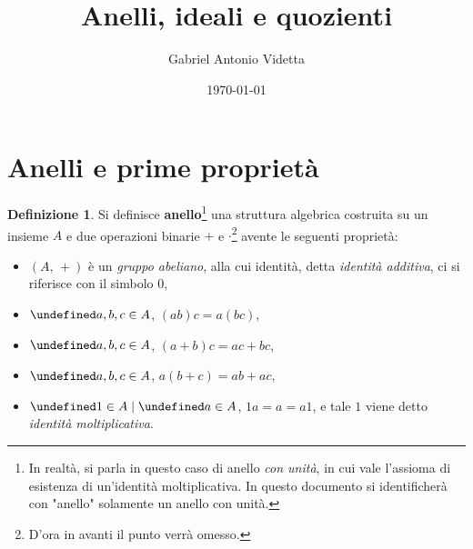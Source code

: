 \documentclass[a4paper]{article}
\title{Anelli, ideali e quozienti}
\author{Gabriel Antonio Videtta}
\date{\today}
\let\oldforall\forall
\let\forall\undefined
\DeclareMathOperator{\forall}{\oldforall}
\let\oldexists\exists
\let\exists\undefined
\DeclareMathOperator{\exists}{\oldexists}
\begin{document}
\maketitle

\newcommand{\nsg}{\mathrel{\unlhd}}

\newcommand{\BB}{\mathcal{B}}
\newcommand{\CC}{\mathbb{C}}
\newcommand{\FF}{\mathbb{F}_2}
\newcommand{\HH}{\mathbb{H}}
\newcommand{\NN}{\mathbb{N}}
\newcommand{\ZZ}{\mathbb{Z}}
\newcommand{\QQ}{\mathbb{Q}}
\newcommand{\RR}{\mathbb{R}}
\newcommand{\KK}{\mathbb{K}}
\newcommand{\LL}[2]{\mathcal{L} \left(#1, \, #2\right)}

\newcommand{\ii}{\mathbf{i}}
\newcommand{\jj}{\mathbf{j}}
\newcommand{\kk}{\mathbf{k}}

\newcommand{\MM}[2]{\mathcal{M}_{#1 \times #2}\left(\KK\right)}
\newcommand{\M}[1]{\mathcal{M}_{#1}\left(\KK\right)}
\newcommand{\Mbb}[3]{\mathcal{M}^{#1}_{#2} \left( #3 \right)}
\newcommand{\Mb}[2]{\mathcal{M}^{#1}_{#2}}

\theoremstyle{definition}
\newtheorem{definition}{Definizione}[section]

\renewcommand{\vec}[1]{\underline{#1}}

\newtheorem{example}{Esempio}[section]
\newtheorem{exercise}{Esercizio}[section]
\newtheorem{theorem}{Teorema}[section]
\newtheorem{proposition}{Proposizione}[section]
\newtheorem{corollary}{Corollario}[section]
\newtheorem*{note}{Osservazione}

\tableofcontents

\section{Anelli e prime proprietà}

\begin{definition}
    Si definisce \textbf{anello}\footnote{In realtà, si parla in questo caso di anello \textit{con unità}, in cui vale l'assioma di esistenza di un'identità
        moltiplicativa. In questo documento si identificherà con "anello" solamente un anello con unità.} una struttura algebrica
    costruita su un insieme $A$ e due operazioni binarie $+$
    e $\cdot$\footnote{D'ora in avanti il punto verrà omesso.} avente le seguenti proprietà:

    \begin{itemize}
        \item $\left(A,\, +\right)$ è un \textit{gruppo abeliano}, alla cui
              identità, detta \textit{identità additiva}, ci si riferisce con il simbolo $0$,
        \item $\forall a, b, c \in A$, $(ab)c = a(bc)$,
        \item $\forall a, b, c \in A$, $(a+b)c=ac+bc$,
        \item $\forall a, b, c \in A$, $a(b+c)=ab+ac$,
        \item $\exists 1 \in A \mid \forall a \in A$, $1a=a=a1$, e tale $1$ viene
              detto \textit{identità moltiplicativa}.
    \end{itemize}
\end{definition}
\end{document}
